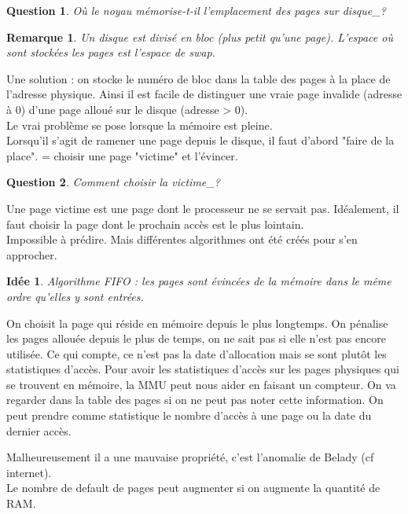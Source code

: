 \documentclass[12pt,a4paper]{report}
\newtheorem*{rem}{Remarque}
\newtheorem*{q}{Question}
\newtheorem*{id}{Idée}
\begin{document}
\begin{q}Où le noyau mémorise-t-il l'emplacement des pages sur disque_?\end{q}
\begin{rem}Un disque est divisé en bloc (plus petit qu'une page). L'espace où sont stockées les pages est l'espace de swap.\end{rem}

Une solution : on stocke le numéro de bloc dans la table des pages à la place de l'adresse physique. Ainsi il est facile de distinguer une vraie page invalide (adresse à 0) d'une page alloué sur le disque (adresse  > 0).\\

Le vrai problème se pose lorsque la mémoire est pleine.\\
Lorsqu'il s'agit de ramener une page depuis le disque, il faut d'abord "faire de la place". = choisir une page "victime" et l'évincer.\\

\begin{q}Comment choisir la victime_?\end{q}
Une page victime est une page dont le processeur ne se servait pas.
Idéalement, il faut choisir la page dont le prochain accès est le plus lointain. \\
Impossible à prédire. Mais différentes algorithmes ont été créés pour s'en approcher.\\

\begin{id}
Algorithme FIFO : les pages sont évincées de la mémoire dans le même ordre qu'elles y sont entrées.\end{id}
On choisit la page qui réside en mémoire depuis le plus longtemps. On pénalise les pages allouée depuis le plus de temps, on ne sait pas si elle n'est pas encore utilisée.
Ce qui compte, ce n'est pas la date d'allocation mais se sont plutôt les statistiques d'accès. Pour avoir les statistiques d'accès sur les pages physiques qui se trouvent en mémoire, la MMU peut nous aider en faisant un compteur. On va regarder dans la table des pages si on ne peut pas noter cette information.
On peut prendre comme statistique le nombre d'accès à une page ou la date du dernier accès.

Malheureusement il a une mauvaise propriété, c'est l'anomalie de Belady (cf internet).\\
Le nombre de default de pages peut augmenter si on augmente la quantité de RAM.\\
\end{document}
